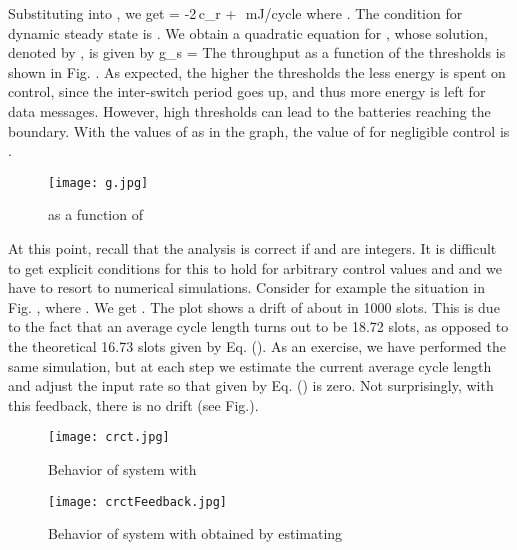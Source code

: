 \documentclass[12 pt]{article}
\newcommand{\debug}[1]{\mbox{\tt #1}}
\renewcommand{\debug}[1]{}              \newcommand{\cmd}[1]{}
\newcommand{\EE}[1]{ \debug{\fbox{\sname #1}}\label{\sname #1} \cmd{EAB}}
\begin{document}
Substituting  into , we get
\EB
\Delta = -2\,c_r + \,\,mJ/cycle
\EE{eq-BD1}
where .
The condition for dynamic steady state is .  We obtain a quadratic equation for , whose solution, denoted by , is given by
\EB
g_s = 
\EE{eq-g}
The throughput  as a function of the thresholds is shown in Fig. .  As expected, the higher the thresholds the less energy is spent on control, since the inter-switch period goes up, and thus more energy is left for data messages.  However, high thresholds can lead to the batteries reaching the boundary.  With the values of  as in the graph, the value of  for negligible control is .

\begin{figure}[hbtp]
\begin{center}
\texttt{[image: g.jpg]}
\caption{ as a function of \debug{\fbox{fig-g}}\label{fig-g}}
\end{center}
\end{figure}

At this point, recall that the analysis is correct if  and  are integers.
It is difficult to get explicit conditions for this to hold for arbitrary control values  and  and we have to resort to numerical simulations.
Consider for example the situation in Fig. , where .
We get .  The plot shows a drift of about  in 1000 slots.
This is due to the fact that an average cycle length turns out to be 18.72 slots, as opposed to the theoretical 16.73 slots given by Eq. ().
As an exercise, we have performed the same simulation, but at each step we estimate the current average cycle length and adjust the input rate  so that  given by Eq. () is zero.
Not surprisingly, with this feedback, there is no drift (see Fig.).

\begin{figure}[hbtp]
\begin{center}
\texttt{[image: crct.jpg]}
\caption{Behavior of system with  \debug{\fbox{fig-crct}}\label{fig-crct}}
\end{center}
\end{figure}

\begin{figure}[hbtp]
\begin{center}
\texttt{[image: crctFeedback.jpg]}
\caption{Behavior of system with  obtained by estimating   \debug{\fbox{fig-crctFeedback}}\label{fig-crctFeedback}}
\end{center}
\end{figure}
\end{document}

